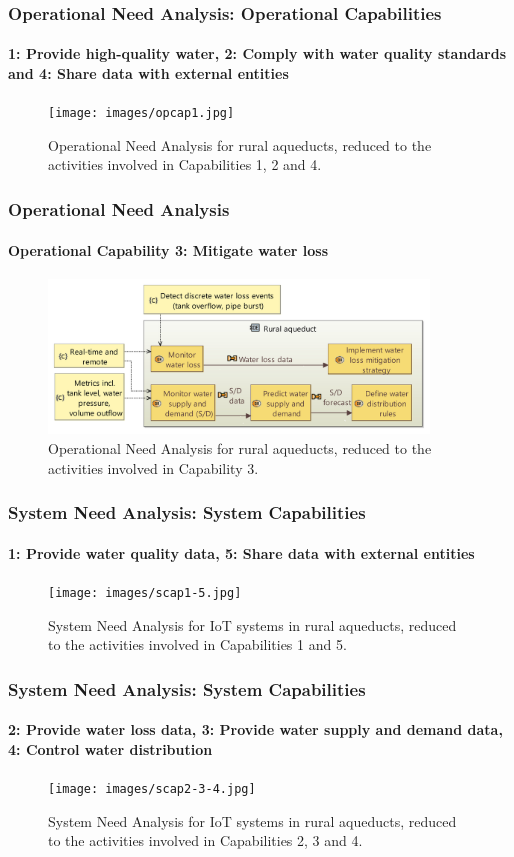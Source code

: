 \documentclass[aspectratio=169]{beamer}
\begin{document}
\begin{frame}
    \frametitle{\small Operational Need Analysis: Operational Capabilities}
    \framesubtitle{1: Provide high-quality water, 2: Comply with water quality standards and 4: Share data with external entities}

    \begin{figure}
        \centering
        \texttt{[image: images/opcap1.jpg]}
        \caption{Operational Need Analysis for rural aqueducts, reduced to the activities involved in Capabilities 1, 2 and 4.}
    \end{figure}
\end{frame}

\begin{frame}
    \frametitle{\small Operational Need Analysis}
    \framesubtitle{Operational Capability 3: Mitigate water loss}

    \begin{figure}
        \centering
        \includegraphics[width=0.9\textwidth]{images/opcap3.jpg}
        \caption{Operational Need Analysis for rural aqueducts, reduced to the activities involved in Capability 3.}
    \end{figure}
\end{frame}

\begin{frame}
    \frametitle{\small System Need Analysis: System Capabilities}
    \framesubtitle{1: Provide water quality data, 5: Share data with external entities}

    \begin{figure}
        \centering
        \texttt{[image: images/scap1-5.jpg]}
        \caption{System Need Analysis for IoT systems in rural aqueducts, reduced to the activities involved in Capabilities 1 and 5.}
    \end{figure}
\end{frame}

\begin{frame}
    \frametitle{\small System Need Analysis: System Capabilities}
    \framesubtitle{2: Provide water loss data, 3: Provide water supply and demand data, 4: Control water distribution}

    \begin{figure}
        \centering
        \texttt{[image: images/scap2-3-4.jpg]}
        \caption{System Need Analysis for IoT systems in rural aqueducts, reduced to the activities involved in Capabilities 2, 3 and 4.}
    \end{figure}
\end{frame}
\end{document}

